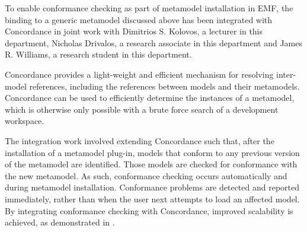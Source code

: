 To enable conformance checking as part of metamodel installation in EMF, the binding to a generic metamodel discussed above has been integrated with Concordance \cite{rose10concordance} in joint work with Dimitrios S. Kolovos, a lecturer in this department, Nicholas Drivalos, a research associate in this department and James R. Williams, a research student in this department.

Concordance provides a light-weight and efficient mechanism for resolving inter-model references, including the references between models and their metamodels. Concordance can be used to efficiently determine the instances of a metamodel, which is otherwise only possible with a brute force search of a development workspace.

The integration work involved extending Concordance such that, after the installation of a metamodel plug-in, models that conform to any previous version of the metamodel are identified. Those models are checked for conformance with the new metamodel. As such, conformance checking occurs automatically and during metamodel installation. Conformance problems are detected and reported immediately, rather than when the user next attempts to load an affected model. By integrating conformance checking with Concordance, improved scalability is achieved, as demonstrated in \cite{rose10concordance}. 